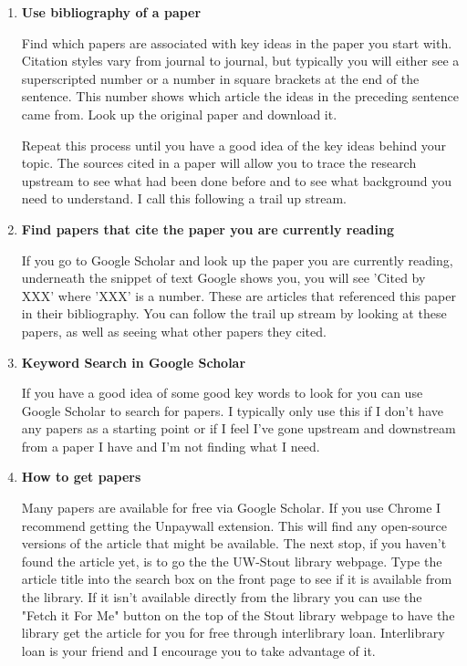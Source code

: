 \documentclass[12pt, letterpaper]{article}
\begin{document}
\begin{enumerate}
\item \textbf{Use bibliography of a paper}

Find which papers are associated with key ideas in the paper you start with.  Citation styles vary from journal to journal, but typically you will either see a superscripted number or a number in square brackets at the end of the sentence.  This number shows which article the ideas in the preceding sentence came from.  Look up the original paper and download it.

Repeat this process until you have a good idea of the key ideas behind your topic.  The sources cited in a paper will allow you to trace the research upstream to see what had been done before and to see what background you need to understand.  I call this following a trail up stream.

\item \textbf{Find papers that cite the paper you are currently reading}

If you go to Google Scholar and look up the paper you are currently reading, underneath the snippet of text Google shows you, you will see 'Cited by XXX' where 'XXX' is a number.  These are articles that referenced this paper in their bibliography.  You can follow the trail up stream by looking at these papers, as well as seeing what other papers they cited. 

\item \textbf{Keyword Search in Google Scholar}

If you have a good idea of some good key words to look for you can use Google Scholar to search for papers.  I typically only use this if I don't have any papers as a starting point or if I feel I've gone upstream and downstream from a paper I have and I'm not finding what I need.

\item \textbf{How to get papers}

Many papers are available for free via Google Scholar.  If you use Chrome I recommend getting the Unpaywall extension.  This will find any open-source versions of the article that might be available.  The next stop, if you haven't found the article yet, is to go the the UW-Stout library webpage.  Type the article title into the search box on the front page to see if it is available from the library.  If it isn't available directly from the library you can use the "Fetch it For Me" button on the top of the Stout library webpage to have the library get the article for you for free through interlibrary loan.  Interlibrary loan is your friend and I encourage you to take advantage of it.  

\end{enumerate}
 
\end{document}
